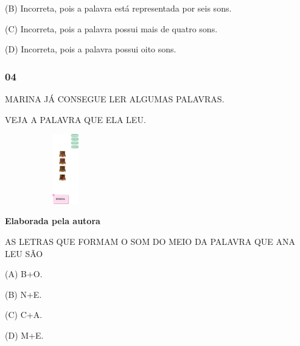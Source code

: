 \begin{escola}
{{{{(B) Incorreta, pois a palavra está representada por seis sons.

(C) Incorreta, pois a palavra possui mais de quatro sons.

(D) Incorreta, pois a palavra possui oito sons.

\subsubsection{04}\label{section-44}

MARINA JÁ CONSEGUE LER ALGUMAS PALAVRAS.

VEJA A PALAVRA QUE ELA LEU.

\includegraphics[width=2.07917in,height=1.19306in]{media/image213.png}

\textbf{Elaborada pela autora}

AS LETRAS QUE FORMAM O SOM DO MEIO DA PALAVRA QUE ANA LEU SÃO

\begin{escolha}
\item(A) B+O.

\item(B) N+E.

\item(C) C+A.

\item(D) M+E.
\end{escolha}

}}}}
\end{escola}
